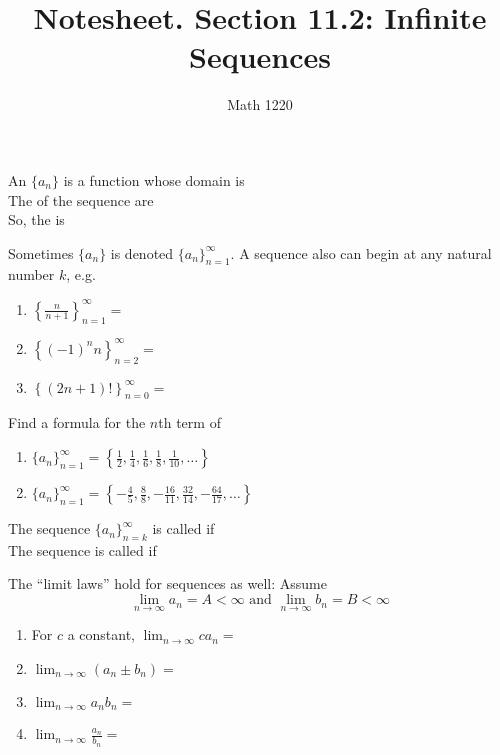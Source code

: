 \documentclass[12pt, a4paper]{article}
\author{Math 1220}
\title{Notesheet. Section 11.2: Infinite Sequences}
\date{}
\begin{document}
\maketitle
\nameline
\begin{defi}
  An  \(\{a_n\}\) is a function whose domain is
  \\

  The  of the sequence are\\
  
  So, the  is 
\end{defi}
\begin{rmk}
  Sometimes \(\{a_n\}\) is denoted \(\{a_n\}_{n=1}^\infty\). A
  sequence also can begin at any natural number \(k\), e.g.
  \begin{enumerate}
  \item \(\left\{ \frac{n}{n+1} \right\}_{n=1}^\infty = \)
  \item \(\left\{ (-1)^n n \right\}_{n=2}^\infty =\)
  \item \(\left\{ (2n+1)! \right\}_{n=0}^\infty =\)
  \end{enumerate}
\end{rmk}
\begin{ex}
  Find a formula for the \(n\)th term of
  \begin{enumerate}
  \item \(\{a_n\}_{n=1}^\infty = \left\{\frac{1}{2}, \frac{1}{4},
      \frac{1}{6}, \frac{1}{8}, \frac{1}{10}, \ldots \right\}\)
  \item \(\{a_n\}_{n=1}^\infty = \left\{ -\frac{4}{5}, \frac{8}{8},
      -\frac{16}{11}, \frac{32}{14}, -\frac{64}{17}, \ldots\right\}\)
  \end{enumerate}
\end{ex}
\vspace{-0.5in}
\begin{defi}
  The sequence \(\{a_n\}_{n=k}^\infty\) is called  if
  \\

  The sequence is called  if 
\end{defi}
\begin{thrm}
  The ``limit laws''  hold for sequences as well: Assume \[
    \lim_{n \to \infty} a_n = A < \infty \text{ and } \lim_{n \to
      \infty} b_n = B < \infty
  \]
  \begin{enumerate}
  \item For \(c\) a constant, \(\lim_{n \to \infty} ca_n = \)
  \item \(\lim_{n \to \infty} (a_n \pm b_n) = \)
  \item \(\lim_{n \to \infty} a_n b_n = \)
  \item \(\lim_{n \to \infty} \frac{a_n}{b_n} = \)
  \end{enumerate}
\end{thrm}
\end{document}
